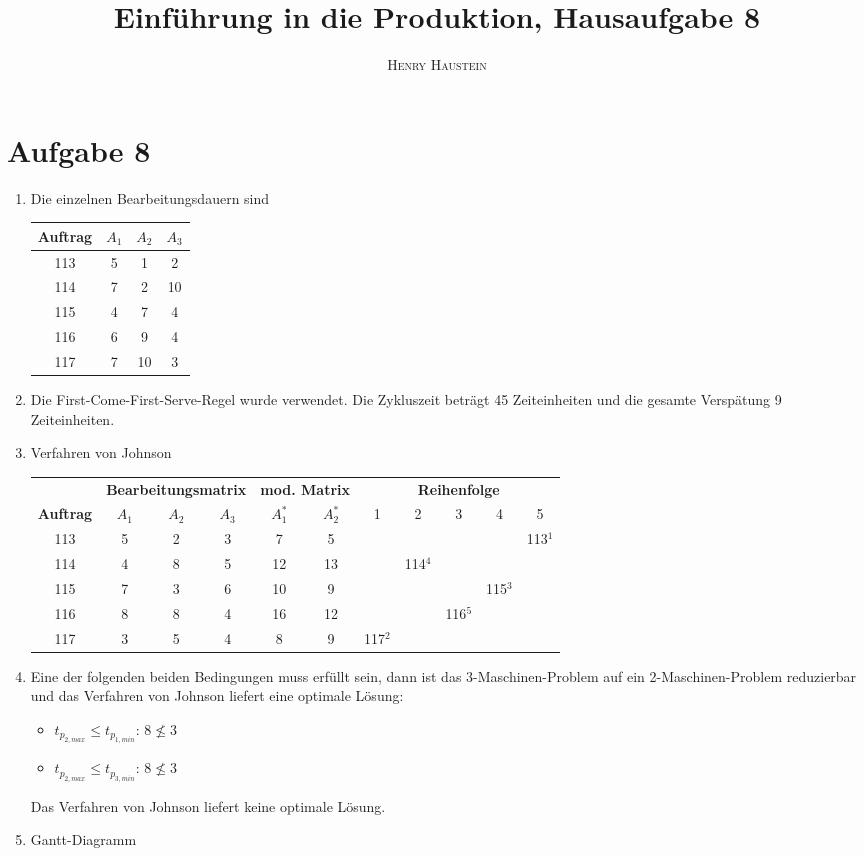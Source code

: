 \documentclass{article}
\title{\textbf{Einführung in die Produktion, Hausaufgabe 8}}
\author{\textsc{Henry Haustein}}
\date{}
\begin{document}
	\maketitle
	
	\section*{Aufgabe 8}
	\begin{enumerate}[label=(\alph*)]
		\item Die einzelnen Bearbeitungsdauern sind
		\begin{center}
			\begin{tabular}{c|ccc}
				\textbf{Auftrag} & $A_1$ & $A_2$ & $A_3$ \\
				\hline
				113 & 5 & 1 & 2 \\
				114 & 7 & 2 & 10 \\
				115 & 4 & 7 & 4 \\
				116 & 6 & 9 & 4 \\
				117 & 7 & 10 & 3
			\end{tabular}
		\end{center}
		\item Die First-Come-First-Serve-Regel wurde verwendet. Die Zykluszeit beträgt 45 Zeiteinheiten und die gesamte Verspätung 9 Zeiteinheiten.
		\item Verfahren von Johnson
		\begin{center}
			\begin{tabular}{c|c|c|c||c|c||ccccc}
				& \multicolumn{3}{c||}{\textbf{Bearbeitungsmatrix}} & \multicolumn{2}{c||}{\textbf{mod. Matrix}} & \multicolumn{5}{c}{\textbf{Reihenfolge}} \\
				\textbf{Auftrag} & $A_1$ & $A_2$ & $A_3$ & $A_1^\ast$ & $A_2^\ast$ & 1 & 2 & 3 & 4 & 5 \\
				\hline
				113 & 5 & 2 & 3 & 7 & 5 & & & & & 113$^1$ \\
				114 & 4 & 8 & 5 & 12 & 13 & & 114$^4$ & & & \\
				115 & 7 & 3 & 6 & 10 & 9 & & & & 115$^3$ & \\
				116 & 8 & 8 & 4 & 16 & 12 & & & 116$^5$ & & \\
				117 & 3 & 5 & 4 & 8 & 9 & 117$^2$ & & & &
			\end{tabular}
		\end{center}
		\item Eine der folgenden beiden Bedingungen muss erfüllt sein, dann ist das 3-Maschinen-Problem auf ein 2-Maschinen-Problem reduzierbar und das Verfahren von Johnson liefert eine optimale Lösung:
		\begin{itemize}
			\item $t_{p_{2,max}} \le t_{p_{1,min}}$: $8\not\le 3$
			\item $t_{p_{2,max}} \le t_{p_{3,min}}$: $8\not\le 3$
		\end{itemize}
		Das Verfahren von Johnson liefert keine optimale Lösung.
		\item Gantt-Diagramm
		\begin{center}
\end{center}
\end{enumerate}
\end{document}
